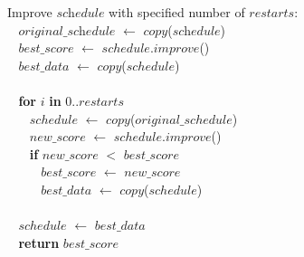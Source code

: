 \begin{tabbing}Improve $\textit{schedule}$ with specified number of $\textit{restarts}$$:$\\
$~~~~$$\textit{original\_schedule}$ $\leftarrow$ $\textit{copy}$($\textit{schedule}$)\\
$~~~~$$best\_score$ $\leftarrow$ $schedule$$.$$\textit{improve}$()\\
$~~~~$$best\_data$ $\leftarrow$ $copy$($schedule$)\\
\\
$~~~~${\bf for} $i$ {\bf in} $0..$$restarts$\\
$~~~~~~~~$$schedule$ $\leftarrow$ $copy$($original\_schedule$)\\
$~~~~~~~~$$new\_score$ $\leftarrow$ $schedule$$.$$improve$()\\
$~~~~~~~~${\bf if} $new\_score$ $<$ $best\_score$\\
$~~~~~~~~~~~~$$best\_score$ $\leftarrow$ $new\_score$\\
$~~~~~~~~~~~~$$best\_data$ $\leftarrow$ $copy$($schedule$)\\
\\
$~~~~$$schedule$ $\leftarrow$ $best\_data$\\
$~~~~${\bf return} $best\_score$\\
\end{tabbing}
